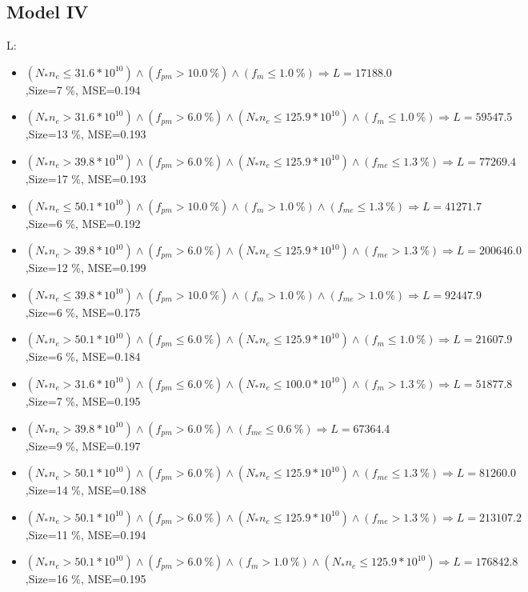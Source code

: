 \documentclass[numbered]{CSL}
\begin{document}
\subsection{Model IV}
L:
\begin{itemize}
\item $(N_* n_e \leq 31.6 * 10^{10}) \land (f_{pm} > 10.0~\%) \land (f_m \leq 1.0~\%) \Rightarrow L = 17188.0$,\hfill Size=7 \%, MSE=0.194
\item $(N_* n_e > 31.6 * 10^{10}) \land (f_{pm} > 6.0~\%) \land (N_* n_e \leq 125.9 * 10^{10}) \land (f_m \leq 1.0~\%) \Rightarrow L = 59547.5$,\hfill Size=13 \%, MSE=0.193
\item $(N_* n_e > 39.8 * 10^{10}) \land (f_{pm} > 6.0~\%) \land (N_* n_e \leq 125.9 * 10^{10}) \land (f_{me} \leq 1.3~\%) \Rightarrow L = 77269.4$,\hfill Size=17 \%, MSE=0.193
\item $(N_* n_e \leq 50.1 * 10^{10}) \land (f_{pm} > 10.0~\%) \land (f_m > 1.0~\%) \land (f_{me} \leq 1.3~\%) \Rightarrow L = 41271.7$,\hfill Size=6 \%, MSE=0.192
\item $(N_* n_e > 39.8 * 10^{10}) \land (f_{pm} > 6.0~\%) \land (N_* n_e \leq 125.9 * 10^{10}) \land (f_{me} > 1.3~\%) \Rightarrow L = 200646.0$,\hfill Size=12 \%, MSE=0.199
\item $(N_* n_e \leq 39.8 * 10^{10}) \land (f_{pm} > 10.0~\%) \land (f_m > 1.0~\%) \land (f_{me} > 1.0~\%) \Rightarrow L = 92447.9$,\hfill Size=6 \%, MSE=0.175
\item $(N_* n_e > 50.1 * 10^{10}) \land (f_{pm} \leq 6.0~\%) \land (N_* n_e \leq 125.9 * 10^{10}) \land (f_m \leq 1.0~\%) \Rightarrow L = 21607.9$,\hfill Size=6 \%, MSE=0.184
\item $(N_* n_e > 31.6 * 10^{10}) \land (f_{pm} \leq 6.0~\%) \land (N_* n_e \leq 100.0 * 10^{10}) \land (f_m > 1.3~\%) \Rightarrow L = 51877.8$,\hfill Size=7 \%, MSE=0.195
\item $(N_* n_e > 39.8 * 10^{10}) \land (f_{pm} > 6.0~\%) \land (f_{me} \leq 0.6~\%) \Rightarrow L = 67364.4$,\hfill Size=9 \%, MSE=0.197
\item $(N_* n_e > 50.1 * 10^{10}) \land (f_{pm} > 6.0~\%) \land (N_* n_e \leq 125.9 * 10^{10}) \land (f_{me} \leq 1.3~\%) \Rightarrow L = 81260.0$,\hfill Size=14 \%, MSE=0.188
\item $(N_* n_e > 50.1 * 10^{10}) \land (f_{pm} > 6.0~\%) \land (N_* n_e \leq 125.9 * 10^{10}) \land (f_{me} > 1.3~\%) \Rightarrow L = 213107.2$,\hfill Size=11 \%, MSE=0.194
\item $(N_* n_e > 50.1 * 10^{10}) \land (f_{pm} > 6.0~\%) \land (f_m > 1.0~\%) \land (N_* n_e \leq 125.9 * 10^{10}) \Rightarrow L = 176842.8$,\hfill Size=16 \%, MSE=0.195

\end{itemize}
\end{document}
